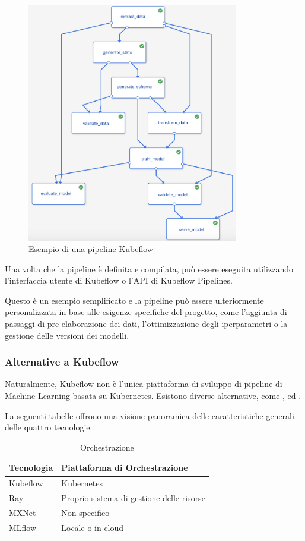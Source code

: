 \begin{figure}[h]
    \centering
    \includegraphics[width=350px]{figures/ch3/kubeflow-pipeline.png}
    \caption[Esempio di una pipeline Kubeflow]{Esempio di una pipeline Kubeflow}
    \label{fig:cha3:kf-pipe}
\end{figure}

Una volta che la pipeline è definita e compilata, può essere eseguita utilizzando l'interfaccia utente di Kubeflow o l'API di Kubeflow Pipelines.

Questo è un esempio semplificato e la pipeline può essere ulteriormente personalizzata in base alle esigenze specifiche del progetto, come l'aggiunta di passaggi di pre-elaborazione dei dati, l'ottimizzazione degli iperparametri o la gestione delle versioni dei modelli.

\subsubsection{Alternative a Kubeflow}

Naturalmente, Kubeflow non è l'unica piattaforma di sviluppo di pipeline di Machine Learning basata su Kubernetes. Esistono diverse alternative, come ,  ed .

La seguenti tabelle offrono una visione panoramica delle caratteristiche generali delle quattro tecnologie. 

\begin{table}[h]
    \centering
    \caption*{Orchestrazione}
    \begin{tabular}{|l|l|}
    \hline
    \textbf{Tecnologia} & \textbf{Piattaforma di Orchestrazione} \\ \hline
    Kubeflow & Kubernetes \\ \hline
    Ray & Proprio sistema di gestione delle risorse \\ \hline
    MXNet & Non specifico \\ \hline
    MLflow & Locale o in cloud \\ \hline
    \end{tabular}
    \end{table}
    
